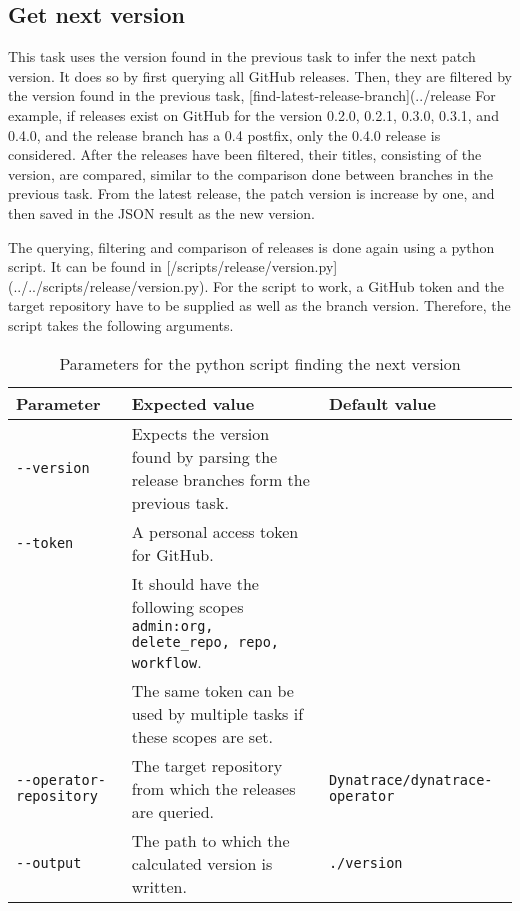 \subsection{Get next version}\label{subsec:get-next-version}

This task uses the version found in the previous task to infer the next patch version.
It does so by first querying all GitHub releases.
Then, they are filtered by the version found in the previous task, [find-latest-release-branch](../release%
For example, if releases exist on GitHub for the version 0.2.0, 0.2.1, 0.3.0, 0.3.1, and 0.4.0, and the release branch has a 0.4 postfix, only the 0.4.0 release is considered.
After the releases have been filtered, their titles, consisting of the version, are compared, similar to the comparison done between branches in the previous task.
From the latest release, the patch version is increase by one, and then saved in the JSON result as the new version.

The querying, filtering and comparison of releases is done again using a python script.
It can be found in [/scripts/release/version.py](../../scripts/release/version.py).
For the script to work, a GitHub token and the target repository have to be supplied as well as the branch version.
Therefore, the script takes the following arguments.


\begin{table}
    \centering
    \caption{Parameters for the python script finding the next version}
    \label{tab:py-finding-the-next-version}
    \begin{tabular}{l|l|l}
        Parameter & Expected value & Default value \\
        \hline
        \verb|--version| & Expects the version found by parsing the release branches form the previous task. &  \\
        \verb|--token| &  A personal access token for GitHub. & \\
        & It should have the following scopes \verb|admin:org, delete_repo, repo, workflow|. & \\
        & The same token can be used by multiple tasks if these scopes are set. & \\
        \verb|--operator-repository| & The target repository from which the releases are queried. & \verb|Dynatrace/dynatrace-operator| \\
        \verb|--output| & The path to which the calculated version is written. & \verb|./version| \\
    \end{tabular}
\end{table}

